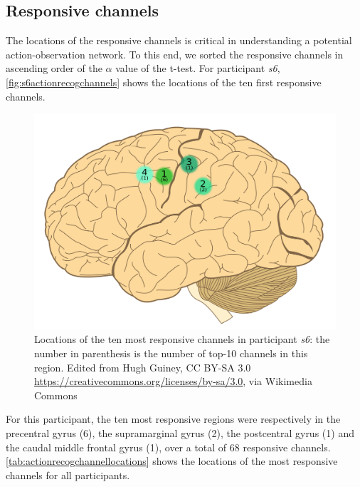 \documentclass[10pt,conference,compsocconf]{IEEEtran}
\begin{document}
\subsection{Responsive channels}
The locations of the responsive channels is critical in understanding a potential action-observation network. To this end, we sorted the responsive channels in ascending order of the \(\alpha\) value of the t-test. For participant \textit{s6}, \autoref{fig:s6actionrecogchannels} shows the locations of the ten first responsive channels.

\begin{figure}[h!]
    \center
    \includegraphics[width=0.8\linewidth]{images/2560px-Human-brain.SVG.png}
    \caption{Locations of the ten most responsive channels in participant \textit{s6}: the number in parenthesis is the number of top-10 channels in this region. Edited from Hugh Guiney, CC BY-SA 3.0 \url{https://creativecommons.org/licenses/by-sa/3.0}, via Wikimedia Commons}
    \label{fig:s6actionrecogchannels}
\end{figure}
\FloatBarrier
For this participant, the ten most responsive regions were respectively in the precentral gyrus (6), the supramarginal gyrus (2), the postcentral gyrus (1) and the caudal middle frontal gyrus (1), over a total of 68 responsive channels. \autoref{tab:actionrecogchannellocations} shows the locations of the most responsive channels for all participants.
\end{document}
